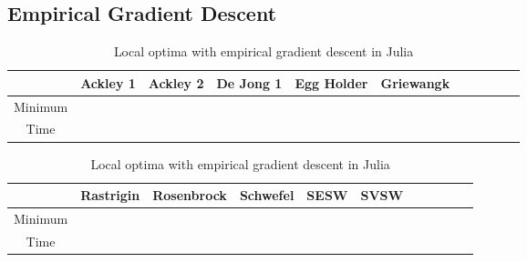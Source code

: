 \documentclass{article}
\begin{document}
        \subsection{Empirical Gradient Descent}

            \begin{table}[h]
                \begin{centering}
                    \begin{tabular}{|c|c|c|c|c|c|c|c|c|c|c|}
                        \hline
                        & Ackley 1 & Ackley 2 & De Jong 1 & Egg Holder & Griewangk \\
                        \hline
                        \hline
                        Minimum & \\
                        \hline
                        Time    & \\
                        \hline
                    \end{tabular}
                    \caption{Local optima with empirical gradient descent in Julia}
            \end{centering}
            \end{table}

            \begin{table}[h]
                \begin{centering}
                    \begin{tabular}{|c|c|c|c|c|c|c|c|c|c|c|}
                        \hline
                        & Rastrigin & Rosenbrock & Schwefel & SESW & SVSW \\
                        \hline
                        \hline
                        Minimum & \\
                        \hline
                        Time    & \\
                        \hline
                    \end{tabular}
                    \caption{Local optima with empirical gradient descent in Julia}
            \end{centering}
            \end{table}
\pagebreak
\end{document}

